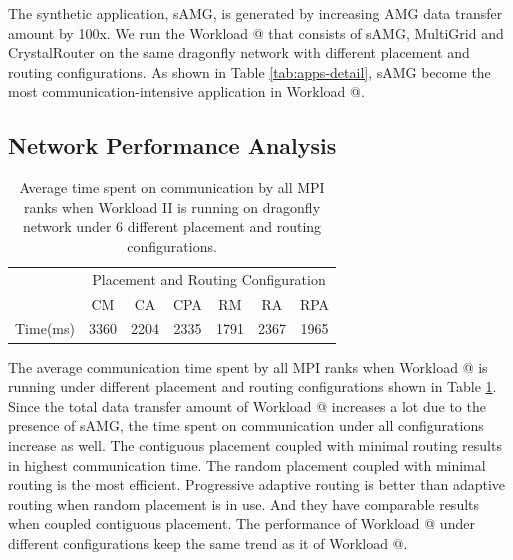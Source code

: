 \documentclass[conference,compsoc]{IEEEtran}
\makeatletter
\newcommand{\Rmnum}[1]{\expandafter\@slowromancap\romannumeral #1@}
\makeatother
\begin{document}
The synthetic application, sAMG, is generated by increasing AMG data transfer amount by 100x. We run the Workload \Rmnum{2 } that consists of sAMG, MultiGrid and CrystalRouter on the same dragonfly network with different placement and routing configurations. As shown in Table \ref{tab:apps-detail}, sAMG become the most communication-intensive application in Workload \Rmnum{2 }. 

\subsection{Network Performance Analysis}
\label{sec: workload-2 network analysis}

\begin{table}[ht]
\begin{center}
\caption{Average time spent on communication by all MPI ranks when Workload II is running on dragonfly network under 6 different placement and routing configurations.} 
\label{tab:syn-wkld-commtime}
\begin{tabular}{l c c c c c c }
\toprule %
\toprule
&\multicolumn{6}{c}{Placement and Routing Configuration} \\ %
\cmidrule(l){2-7}
	      & CM & CA & CPA & RM & RA & RPA \\ %
\midrule %
Time(ms)  & 3360 & 2204 & 2335 & 1791 & 2367 & 1965 \\ %

\midrule %
\bottomrule %
\end{tabular}
\end{center}
\end{table}


The average communication time spent by all MPI ranks when Workload \Rmnum{2} is running under different placement and routing configurations shown in Table \ref{tab:syn-wkld-commtime}. Since the total data transfer amount of Workload \Rmnum{2} increases a lot due to the presence of sAMG, the time spent on communication under all configurations increase as well. The contiguous placement coupled with minimal routing results in highest communication time. The random placement coupled with minimal routing is the most efficient. Progressive adaptive routing is better than adaptive routing when random placement is in use. And they have comparable results when coupled contiguous placement. The performance of Workload \Rmnum{2} under different configurations keep the same trend as it of Workload \Rmnum{1}. 
\end{document}
